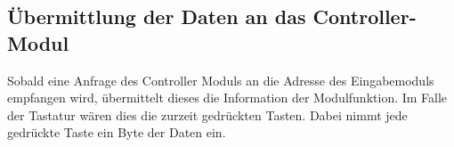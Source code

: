 

\subsection{Übermittlung der Daten an das Controller-Modul}
Sobald eine Anfrage des Controller Moduls an die Adresse des Eingabemoduls empfangen wird, übermittelt dieses die Information der Modulfunktion. Im Falle der Tastatur wären dies die zurzeit gedrückten Tasten. Dabei nimmt   jede gedrückte Taste ein Byte der Daten ein. 

